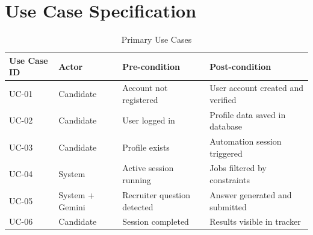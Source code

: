 \documentclass[12pt,a4paper,oneside]{report}
\begin{document}
\section{Use Case Specification}
\begin{table}[H]
\centering
\caption{Primary Use Cases}
\begin{tabular}{p{}p{}p{}p{}}
\toprule
Use Case ID & Actor & Pre-condition & Post-condition \\
\midrule
UC-01 & Candidate & Account not registered & User account created and verified \\
UC-02 & Candidate & User logged in & Profile data saved in database \\
UC-03 & Candidate & Profile exists & Automation session triggered \\
UC-04 & System & Active session running & Jobs filtered by constraints \\
UC-05 & System + Gemini & Recruiter question detected & Answer generated and submitted \\
UC-06 & Candidate & Session completed & Results visible in tracker \\
\bottomrule
\end{tabular}
\end{table}
\end{document}
